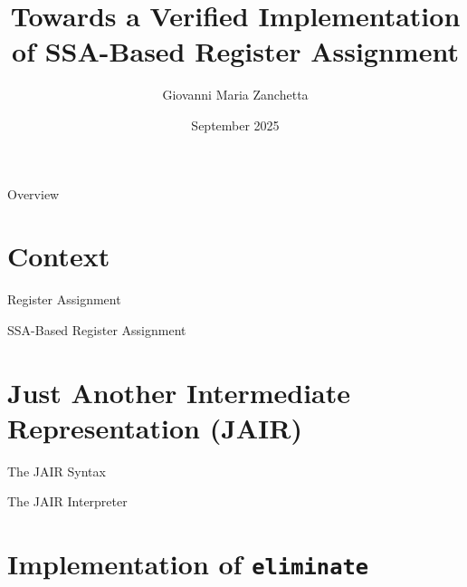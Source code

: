 \documentclass[aspectratio=169,xcolor=dvipsnames]{beamer}
\title{Towards a Verified Implementation of SSA-Based Register Assignment}
\author{Giovanni Maria Zanchetta}
\institute
{
    Advisor: Prof. Marco Patrignani \\
    Co-Advisor: Matthis Kruse \\
}
\date{September 2025}
\begin{document}
\begin{frame}
    \titlepage
\end{frame}

\begin{frame}{Overview}
    \tableofcontents
\end{frame}

\section{Context}
% 

\begin{frame}{Register Assignment}

\end{frame}

\begin{frame}{SSA-Based Register Assignment}

\end{frame}

% 

\section{Just Another Intermediate Representation (JAIR)}

\begin{frame}{The JAIR Syntax}

\end{frame}

\begin{frame}{The JAIR Interpreter}

\end{frame}

\section{Implementation of \texttt{eliminate}}
\end{document}
